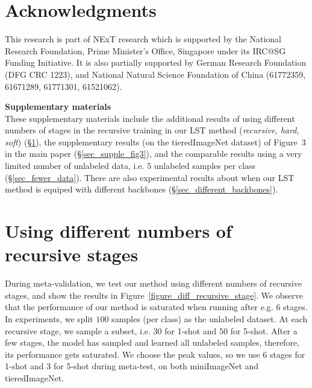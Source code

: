 \documentclass{article}
\begin{document}
\section*{Acknowledgments}
This research is part of NExT research which is supported by the National Research Foundation, Prime Minister's Office, Singapore under its IRC@SG Funding Initiative.
It is also partially supported by German Research Foundation (DFG CRC 1223), and National Natural Science Foundation of China (61772359, 61671289, 61771301, 61521062).




{}


\clearpage



\setcounter{section}{0}
\renewcommand\thesection{\Alph{section}}
\noindent
{\Large {\textbf{Supplementary materials}}}
\\

These supplementary materials include 
the additional results of using different numbers of stages in the recursive training in our LST method (\emph{recursive, hard, soft}) (\S\ref{sec_stages}), 
the supplementary results (on the tieredImageNet dataset) of Figure~3 in the main paper (\S\ref{sec_supple_fig3}),
and the comparable results using a very limited number of unlabeled data, i.e. $5$ unlabeled samples per class (\S\ref{sec_fewer_data}). There are also experimental results about when our LST method is equiped with different backbones (\S\ref{sec_different_backbones}).


\section{Using different numbers of recursive stages}
\label{sec_stages}

During meta-validation, we test our method using different numbers of recursive stages, and show the results in Figure~\ref{figure_diff_recursive_stage}.
We observe that the performance of our method is saturated when running after e.g. $6$ stages. 
In experiments, we split $100$ samples (per class) as the unlabeled dataset.
At each recursive stage, we sample a subset, i.e. $30$ for 1-shot and $50$ for 5-shot. After a few stages, the model has sampled and learned all unlabeled samples, therefore, its performance gets saturated.
We choose the peak values, so we use $6$ stages for 1-shot and $3$ for 5-shot during meta-test, on both miniImageNet and tieredImageNet.
\end{document}
